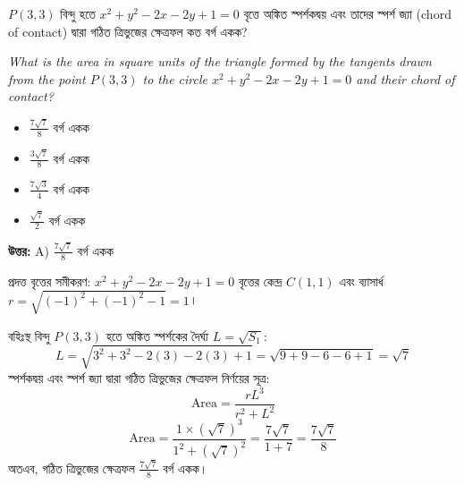 \documentclass[12pt, a4paper]{article}
\begin{document}
\begin{tcolorbox}[questionbox={প্রশ্ন (Question) 10}]
    \noindent
    $P(3, 3)$ বিন্দু হতে $x^2 + y^2 - 2x - 2y + 1 = 0$ বৃত্তে অঙ্কিত স্পর্শকদ্বয় এবং তাদের স্পর্শ জ্যা (chord of contact) দ্বারা গঠিত ত্রিভুজের ক্ষেত্রফল কত বর্গ একক?
    
    \vspace{0.8em}
    \begin{english}
    \noindent\textit{\color{darkgray}
    What is the area in square units of the triangle formed by the tangents drawn from the point $P(3, 3)$ to the circle $x^2 + y^2 - 2x - 2y + 1 = 0$ and their chord of contact?
    }
    \end{english}
\end{tcolorbox}

\begin{itemize}[label={}, leftmargin=1cm, itemsep=0.5em]
    \item[\textbf{A)}] $\frac{7\sqrt{7}}{8}$ বর্গ একক
    \item[\textbf{B)}] $\frac{3\sqrt{7}}{8}$ বর্গ একক
    \item[\textbf{C)}] $\frac{7\sqrt{3}}{4}$ বর্গ একক
    \item[\textbf{D)}] $\frac{\sqrt{7}}{2}$ বর্গ একক
\end{itemize}

\vspace{0.5em}
\begin{tcolorbox}[answerbox]
    \textbf{\color{success} উত্তর:} A) $\frac{7\sqrt{7}}{8}$ বর্গ একক
\end{tcolorbox}
\vspace{1em}

\begin{tcolorbox}[solutionbox={সমাধান (Solution)}]
    \noindent
    প্রদত্ত বৃত্তের সমীকরণ: $x^2 + y^2 - 2x - 2y + 1 = 0$
    বৃত্তের কেন্দ্র $C(1, 1)$ এবং ব্যাসার্ধ $r = \sqrt{(-1)^2 + (-1)^2 - 1} = 1$।
    
    \vspace{0.5em}
    বহিঃস্থ বিন্দু $P(3, 3)$ হতে অঙ্কিত স্পর্শকের দৈর্ঘ্য $L = \sqrt{S_1}$:
    \[ L = \sqrt{3^2 + 3^2 - 2(3) - 2(3) + 1} = \sqrt{9 + 9 - 6 - 6 + 1} = \sqrt{7} \]
    স্পর্শকদ্বয় এবং স্পর্শ জ্যা দ্বারা গঠিত ত্রিভুজের ক্ষেত্রফল নির্ণয়ের সূত্র:
    \[ \text{Area} = \frac{r L^3}{r^2 + L^2} \]
    \[ \text{Area} = \frac{1 \times (\sqrt{7})^3}{1^2 + (\sqrt{7})^2} = \frac{7\sqrt{7}}{1 + 7} = \frac{7\sqrt{7}}{8} \]
    অতএব, গঠিত ত্রিভুজের ক্ষেত্রফল $\frac{7\sqrt{7}}{8}$ বর্গ একক।
\end{tcolorbox}
\end{document}
